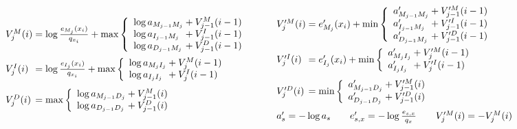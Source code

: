 \documentclass[nonatbib]{sigplanconf}
\begin{document}
\begin{figure}
\newcommand\vsum[2]{#2&{}+{}& #1}

\def\goo{18pt}
\def\gum{14pt}
\[
\begin{array}{l@{}c@{}l}
V_{j}^{M}(i) &{}={}& \log\frac{e_{M_{j}}(x_{i})}{q_{x_{i}}} + \max \left\{
\begin{array}{l@{}c@{}l}
\vsum{V_{j-1}^{M}(i - 1)} {\log a_{M_{j-1}M_{j}}}\\
\vsum{V_{j-1}^{I}(i - 1)} {\log a_{I_{j-1}M_{j}}}\\
\vsum{V_{j-1}^{D}(i - 1)} {\log a_{D_{j-1}M_{j}}}\\
\end{array} \right.\\[\goo]
V_{j}^{I}(i) &=& \log\frac{e_{I_{j}}(x_{i})}{q_{x_{i}}} + \max \left\{
\begin{array}{l@{}c@{}l}
\vsum{V_{j}^{M}(i - 1)} {\log a_{M_{j}I_{j}}}\\
\vsum{V_{j}^{I}(i - 1)} {\log a_{I_{j}I_{j}}}\\
\end{array} \right.\\[\gum]
V_{j}^{D}(i) &=& \max \left\{
\begin{array}{l@{}c@{}l}
\vsum{V_{j-1}^{M}(i)} {\log a_{M_{j-1}D_{j}}}\\
\vsum{V_{j-1}^{D}(i)} {\log a_{D_{j-1}D_{j}}}\\
\end{array} \right.\\
\end{array}
\qquad
\begin{array}{l@{}c@{}l}
V_{j}^{\prime M}(i) &{}={}& e^{\prime}_{M_{j}}(x_{i}) + \min \left\{
\begin{array}{l@{}c@{}l}
\vsum{V_{j-1}^{\prime M}(i - 1)} {a^{\prime}_{M_{j-1}M_{j}}}\\
\vsum{V_{j-1}^{\prime I}(i - 1)} {a^{\prime}_{I_{j-1}M_{j}}}\\
\vsum{V_{j-1}^{\prime D}(i - 1)} {a^{\prime}_{D_{j-1}M_{j}}}\\
\end{array} \right.\\[\goo]
V_{j}^{\prime I}(i) &=& e^{\prime}_{I_{j}}(x_{i}) + \min \left\{
\begin{array}{l@{}c@{}l}
\vsum{V_{j}^{\prime M}(i - 1)} {a^{\prime}_{M_{j}I_{j}}}\\
\vsum{V_{j}^{\prime I}(i - 1)} {a^{\prime}_{I_{j}I_{j}}}\\
\end{array} \right.\\[\gum]
V_{j}^{\prime D}(i) &=& \min \left\{
\begin{array}{l@{}c@{}l}
\vsum{V_{j-1}^{\prime M}(i)} {a^{\prime}_{M_{j-1}D_{j}}}\\
\vsum{V_{j-1}^{\prime D}(i)} {a^{\prime}_{D_{j-1}D_{j}}}\\
\end{array} \right.\\[\gum]
\multicolumn3{l}{%
a'_{s} = - \log a_{s} 
\qquad
e^{\prime}_{s,x} = - \log\frac{e_{s,x}}{q_{x}}
\qquad
V_j^{\prime M}(i) = - V_j^{M}(i)
}
\\
\end{array}
\]


\end{figure}
\end{document}
